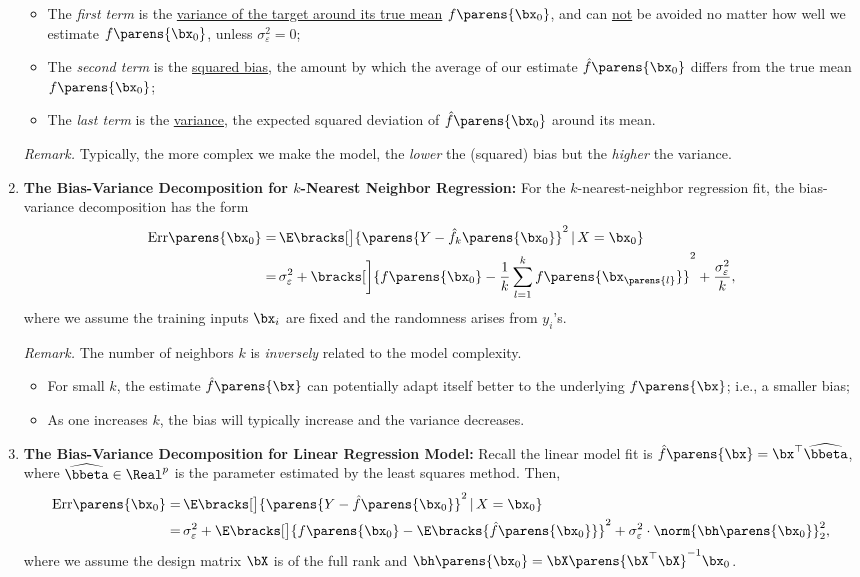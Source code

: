 \documentclass[12pt]{article}
\begin{document}
\begin{enumerate}[label=\textbf{\arabic*.}]
\begin{itemize}
		\item The \textit{first term} is the \underline{variance of the target around its true mean} $ f \parens{\bx_0} $, and can \underline{not} be avoided no matter how well we estimate $ f \parens{\bx_0} $, unless $\sigma_{\varepsilon}^2 = 0$; 
		\item The \textit{second term} is the \underline{squared bias}, the amount by which the average of our estimate $\hat{f} \parens{\bx_0}$ differs from the true mean $f \parens{\bx_0}$; 
		\item The \textit{last term} is the \underline{variance}, the expected squared deviation of $\hat{f} \parens{\bx_0}$ around its mean. 
	\end{itemize} 
	\textit{Remark.} Typically, the more complex we make the model, the \textit{lower} the (squared) bias but the \textit{higher} the variance. 
	
	\item \textbf{The Bias-Variance Decomposition for $k$-Nearest Neighbor Regression:} For the $k$-nearest-neighbor regression fit, the bias-variance decomposition has the form 
	\begin{align*}
		\mathrm{Err} \parens{\bx_0} = & \, \E \bracks[\big]{ \parens{Y - \hat{f}_k \parens{\bx_0}}^2 \,\vert\, X = \bx_0 } \nonumber \\
		= & \, \sigma_{\varepsilon}^2 + \bracks[\bigg]{ f \parens{\bx_0} - \frac{1}{k} \sum_{l=1}^k f\parens{\bx_{ \parens{l} }} }^2 + \frac{\sigma_{\varepsilon}^2}{k}, 
	\end{align*}
	where we assume the training inputs $\bx_i$ are fixed and the randomness arises from $y_i$'s. 
	
	\textit{Remark.} The number of neighbors $k$ is \emph{inversely} related to the model complexity. 
	\begin{itemize}
		\item For small $k$, the estimate $ \hat{f} \parens{\bx}$ can potentially adapt itself better to the underlying $f \parens{\bx}$; i.e., a smaller bias; 
		\item As one increases $k$, the bias will typically increase and the variance decreases. 
	\end{itemize}
	
	\item \textbf{The Bias-Variance Decomposition for Linear Regression Model:} Recall the linear model fit is $\hat{f} \parens{\bx} = \bx^\top \widehat{\bbeta}$, where $\widehat{\bbeta} \in \Real^p$ is the parameter estimated by the least squares method. Then, 
	\begin{align}
		\mathrm{Err} \parens{\bx_0} = & \, \E \bracks[\big]{ \parens{Y - \hat{f} \parens{\bx_0}}^2 \,\vert\, X = \bx_0 } \nonumber \\
		= & \, \sigma_{\varepsilon}^2 + \E \bracks[\big]{ f \parens{\bx_0} - \E \bracks{\hat{f} \parens{\bx_0}} }^2 + \sigma_{\varepsilon}^2 \cdot \norm{\bh \parens{\bx_0}}_2^2, \label{eq-test-err-linear-reg}
	\end{align}
	where we assume the design matrix $\bX$ is of the full rank and $\bh\parens{\bx_0} = \bX\parens{\bX^\top \bX}^{-1} \bx_0$. 
	

\end{enumerate}
\end{document}
